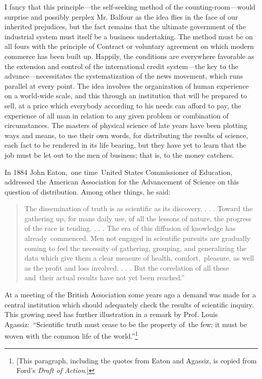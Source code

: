 \documentclass[openany,nobib]{tufte-book}
\begin{document}
\newpage I fancy that this principle---the self-seeking method of the
counting-room---would surprise and possibly perplex Mr. Balfour as the
idea flies in the face of our inherited prejudices, but the fact remains
that the ultimate government of the industrial system must itself be a
business undertaking. The method must be on all fours with the principle
of Contract or voluntary agreement on which modern commerce has been
built up. Happily, the conditions are everywhere favorable as the
extension and control of the international credit system---the key to
the advance---necessitates the systematization of the news movement,
which runs parallel at every point. The idea involves the organization
of human experience on a world-wide scale, and this through an
institution that will be prepared to sell, at a price which everybody
according to his needs can afford to pay, the experience of all man in
relation to any given problem or combination of circumstances. The
masters of physical science of late years have been plotting ways and
means, to use their own words, for distributing the results of science,
each fact to be rendered in its life bearing, but they have yet to learn
that the job must be let out to the men of business; that is, to the
money catchers.~

In 1884 John Eaton,~one time~United States Commissioner of Education,
addressed the American Association for the Advancement of Science on
this question of distribution. Among other things, he said:~

\begin{quote}
The dissemination of truth is as scientific as its discovery. . . .
Toward the gathering up, for man\textquotesingle s daily use, of all the
lessons of nature, the progress of the race is tending. . . . The era of
this diffusion of knowledge has already~commenced. Men not engaged in
scientific pursuits are gradually coming to feel the necessity of
gathering, grouping, and generalizing the data which give them a clear
measure of health, comfort,~pleasure, as well as the profit and loss
involved. . . . But the correlation of all these and~their actual
results have not yet been reached.''~
\end{quote}

\noindent At a meeting of the British Association some years ago a demand was made
for a central institution which should adequately check the results of
scientific inquiry. This growing need has further illustration in a
remark by Prof. Louis Agassiz:~``Scientific truth must cease to be the
property of~the few; it must be woven with the common life of the
world.''\footnote{{[}This paragraph, including the quotes from Eaton and
  Agassiz, is copied from Ford's \emph{Draft of Action}.{]}}~
\end{document}
